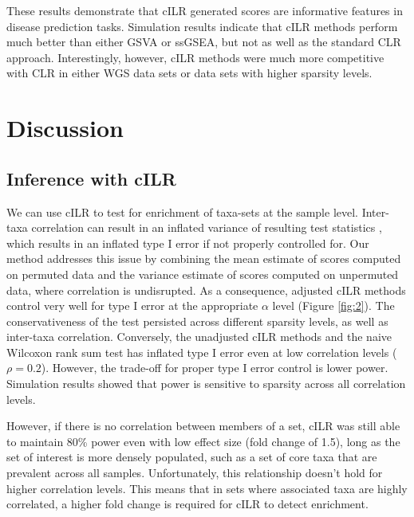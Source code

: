 \documentclass{article}
\begin{document}
These results demonstrate that cILR generated scores are informative features in disease prediction tasks. Simulation results indicate that cILR methods perform much better than either GSVA or ssGSEA, but not as well as the standard CLR approach. Interestingly, however, cILR methods were much more competitive with CLR in either WGS data sets or data sets with higher sparsity levels. 


\section*{Discussion}

\subsection*{Inference with cILR}
We can use cILR to test for enrichment of taxa-sets at the sample level. Inter-taxa correlation can result in an inflated variance of resulting test statistics \cite{wu2012}, which results in an inflated type I error if not properly controlled for. Our method addresses this issue by combining the mean estimate of scores computed on permuted data and the variance estimate of scores computed on unpermuted data, where correlation is undisrupted. As a consequence, adjusted cILR methods control very well for type I error at the appropriate $\alpha$ level (Figure \ref{fig:2}). The conservativeness of the test persisted across different sparsity levels, as well as inter-taxa correlation. Conversely, the unadjusted cILR methods and the naive Wilcoxon rank sum test has inflated type I error even at low correlation levels ($\rho = 0.2$). However, the trade-off for proper type I error control is lower power. Simulation results showed that power is sensitive to sparsity across all correlation levels. 

However, if there is no correlation between members of a set, cILR was still able to maintain 80\% power even with low effect size (fold change of 1.5), long as the set of interest is more densely populated, such as a set of core taxa that are prevalent across all samples. Unfortunately, this relationship doesn't hold for higher correlation levels. This means that in sets where associated taxa are highly correlated, a higher fold change is required for cILR to detect enrichment. 
\end{document}
